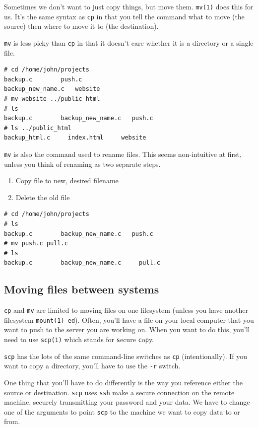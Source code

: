 Sometimes we don't want to just copy things, but move them. {\tt mv(1)}
does this for us.  It's the same syntax as {\tt cp} in that you tell the
command what to move (the source) then where to move it to (the destination).

{\tt mv} is less picky than {\tt cp} in that it doesn't care whether it is a 
directory or a single file.

{\tt \begin{verbatim}
# cd /home/john/projects
backup.c		push.c
backup_new_name.c	website
# mv website ../public_html
# ls
backup.c		backup_new_name.c	push.c
# ls ../public_html
backup_html.c     index.html     website
\end{verbatim}
}

{\tt mv} is also the command used to rename files. 
This seems non-intuitive at first, unless you think of
renaming as two separate steps. 
\begin{enumerate}
\item Copy file to new, desired filename
\item Delete the old file
\end{enumerate}

{\tt \begin{verbatim}
# cd /home/john/projects
# ls 
backup.c		backup_new_name.c	push.c
# mv push.c pull.c
# ls
backup.c		backup_new_name.c     pull.c
\end{verbatim}
}

\subsection{Moving files between systems}
{\tt cp} and {\tt mv} are limited to moving files on one
filesystem (unless you have another filesystem {\tt mount(1)-ed}).
Often, you'll have a file on your local computer that you want to 
push to the server you are working on.  When you want to do this,
you'll need to use {\tt scp(1)} which stands for {\tt s}ecure {\tt c}o{\tt p}y.

{\tt scp} has the lots of the same command-line switches as {\tt cp} (intentionally). 
If you want to copy a directory, you'll have to use the {\tt -r} switch.

One thing that you'll have to do differently is the way you reference
either the source or destination. {\tt scp} uses {\tt ssh} 
make a secure connection on the remote machine, securely transmitting
your password and your data. We have to change one of the arguments to
point {\tt scp} to the machine we want to copy data to or from.

